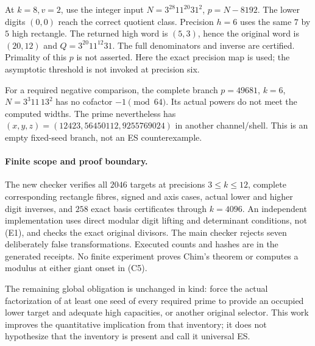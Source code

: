 At $k=8,v=2$, use the integer input
$N=3^{28}11^{20}31^2$, $p=N-8192$. The lower digits $(0,0)$ reach the
correct quotient class. Precision $h=6$ uses the same $7$ by $5$ high rectangle.
The returned high word is $(5,3)$, hence the original word is $(20,12)$ and
$Q=3^{20}11^{12}31$. The full denominators and inverse are certified.
Primality of this $p$ is not asserted. Here the exact precision map is used;
the asymptotic threshold is not invoked at precision six.

For a required negative comparison, the complete branch
$p=49681$, $k=6$, $N=3^3 11\,13^2$ has no cofactor $-1\pmod{64}$.
Its actual powers do not meet the computed widths. The prime nevertheless has
$(x,y,z)=(12423,56450112,9255769024)$ in another channel/shell. This is an
empty fixed-seed branch, not an ES counterexample.

\paragraph{Finite scope and proof boundary.}
The new checker verifies all $2046$ targets at precisions $3\le k\le12$,
complete corresponding rectangle fibres, signed and axis cases, actual lower
and higher digit inverses, and $258$ exact basis certificates through
$k=4096$. An independent implementation uses direct modular digit lifting
and determinant conditions, not (E1), and checks the exact original divisors.
The main checker rejects seven deliberately false transformations. Executed
counts and hashes are in the generated receipts. No finite experiment proves
Chim's theorem or computes a modulus at either giant onset in (C5).

The remaining global obligation is unchanged in kind: force the actual
factorization of at least one seed of every required prime to provide an
occupied lower target and adequate high capacities, or another original
selector. This work improves the quantitative implication from that inventory;
it does not hypothesize that the inventory is present and call it universal ES.
